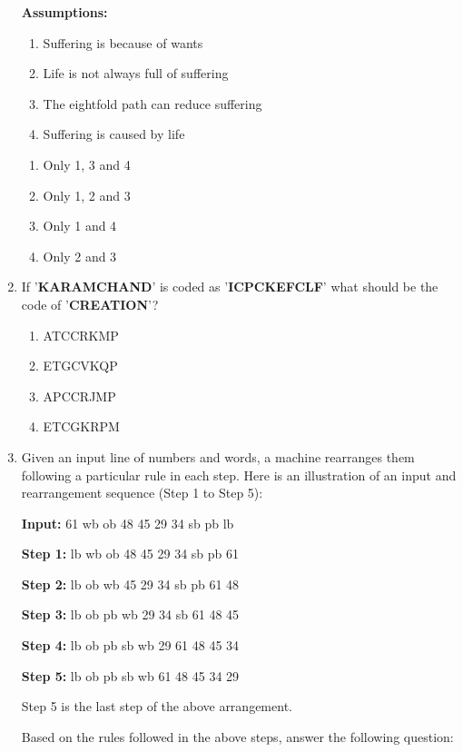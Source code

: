 \documentclass[journal,12pt,onecolumn]{exam}
\theoremstyle{remark}
\begin{document}
\begin{enumerate}
\textbf{Assumptions:}
\begin{enumerate}[label=\arabic*.]
    \item Suffering is because of wants
    \item Life is not always full of suffering
    \item The eightfold path can reduce suffering
    \item Suffering is caused by life
\end{enumerate}

\begin{enumerate}[label=(\Alph*)]
    \item Only 1, 3 and 4
    \item Only 1, 2 and 3
    \item Only 1 and 4
    \item Only 2 and 3
\end{enumerate}

\item If '\textbf{KARAMCHAND}' is coded as '\textbf{ICPCKEFCLF}' what should be the code of '\textbf{CREATION}'?

\begin{enumerate}[label=(\Alph*)]
    \item ATCCRKMP
    \item ETGCVKQP
    \item APCCRJMP
    \item ETCGKRPM
\end{enumerate}

\item Given an input line of numbers and words, a machine rearranges them following a particular rule in each step. Here is an illustration of an input and rearrangement sequence (Step 1 to Step 5):

\textbf{Input:} 61 wb ob 48 45 29 34 sb pb lb

\textbf{Step 1:} lb wb ob 48 45 29 34 sb pb 61

\textbf{Step 2:} lb ob wb 45 29 34 sb pb 61 48

\textbf{Step 3:} lb ob pb wb 29 34 sb 61 48 45

\textbf{Step 4:} lb ob pb sb wb 29 61 48 45 34

\textbf{Step 5:} lb ob pb sb wb 61 48 45 34 29

Step 5 is the last step of the above arrangement.

\vspace{1em}

Based on the rules followed in the above steps, answer the following question:
\vspace{1em}


\end{enumerate}
\end{document}
